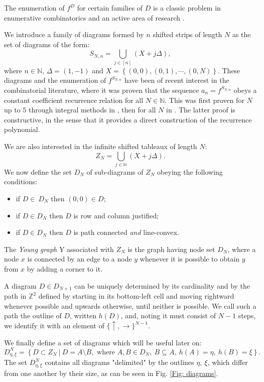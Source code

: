 \documentclass{article}
\begin{document}
The enumeration of $f^D$ for certain families of $D$ is a classic problem in enumerative combinatorics and an active area of research \cite{EnumTableaux}.

We introduce a family of diagrams formed by $n$ shifted strips of length $N$ as the set of diagrams of the form:
\[
S_{N,n}=\bigcup_{j \in [n]}\left(X+j\Delta\right),
\]
where $n\in\mathbb{N}$, $\Delta=(1,-1)$ and $X=\left\{(0,0),(0,1),\cdots,(0,N)\right\}$. These diagrams and the enumeration of $f^{S_{N,n}}$ have been of recent interest in the combinatorial literature, where it was proven that the sequence $a_n=f^{S_{N,n}}$ obeys a constant coefficient recurrence relation for all $N\in\mathbb{N}$. This was first proven for $N$ up to $5$ through integral methods in \cite{Sun2015EnumerationOS}, then for all $N$ in \cite{VeraLopez2017}. The latter proof is constructive, in the sense that it provides a direct construction of the recurrence polynomial. 

We are also interested in the infinite shifted tableaux of length $N$:
\begin{equation}
\label{inifinite shape}
Z_{N}=\bigcup_{j \in \mathbb{N}}\left(X+j\Delta\right).
\end{equation}
We now define the set $D_N$ of sub-diagrams of $Z_N$ obeying the following conditions:
\begin{itemize}
    \item if $D\in\ D_N$ then $(0,0)\in D$;
    \item if $D\in D_N$ then $D$ is row and column justified;
    \item if $D\in D_N$ then $D$ is path connected \textit{and} line-convex.
\end{itemize}
The \textit{Young graph} $\mathrm{Y}$ associated with $Z_{N}$ is the graph having node set $D_N$, where a node $x$ is connected by an edge to a node $y$ whenever it is possible to obtain $y$ from $x$ by adding a corner to it. 

A diagram $D\in D_{N+1}$ can be uniquely determined by its cardinality and by the path in $\mathbb{Z}^2$ defined by starting in its bottom-left cell and moving rightward whenever possible and upwards otherwise, until neither is possible. We call such a path the outline of $D$, written $h(D)$, and, noting it must consist of $N-1$ steps, we identify it with an element of $\{\uparrow,\to\}^{N-1}$.

We finally define a set of diagrams which will be useful later on:
\[
D^N_{\eta,\xi}=\left\{D\subset Z_N \ | \ D=A\setminus B, \text{ where }A,B\in D_N, \ B\subseteq A, \ h(A)=\eta, \ h(B)=\xi   \right\}.
\]
The set $D^N_{\eta,\xi}$ contains all diagrams "delimited" by the outlines $\eta, \ \xi$, which differ from one another by their size, as can be seen in Fig. \ref{Fig: diagrams}.
\end{document}
